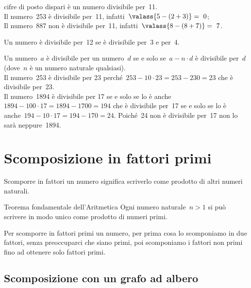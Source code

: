 \begin{description} [noitemsep]
cifre di posto dispari è un numero divisibile per~11.\\
Il numero~253 è divisibile per~11, infatti~\(\valass{5-(2+3)} =~0\);\\
Il numero~887 non è divisibile per~11, infatti~\(\valass{8-(8+7)}=~7\).
\item[\textbf{12}:~] Un numero è divisibile per~12 se è 
divisibile 
per~3 e per~4.
\item[\textbf{un numero qualunque}:~] Un numero~\(a\) è divisibile 
per un numero~\(d\) se e solo se~\(a - n \cdot d\) è divisibile per~\(d\) 
(dove~\(n\) è un numero naturale qualsiasi).\\
Il numero~253 è divisibile per 23 
perché~\(253 - 10 \cdot 23 = 253 - 230 = 23\) che è divisibile per~23.\\
Il numero~1894 è divisibile per 17 se e solo se lo è 
anche~\(1894 - 100 \cdot 17 = 1894 - 1700 = 194\) 
che è divisibile per~17 se e solo se lo è
anche~\(194 - 10 \cdot 17 = 194 - 170 = 24\). 
Poiché~24 non è divisibile per~17 non lo sarà neppure~1894.
\end{description}



\section{Scomposizione in fattori primi}
\label{sec:nat_scomposizione}

Scomporre in fattori un numero significa scriverlo come prodotto di altri 
numeri naturali. 


\begin{teorema}{Teorema fondamentale dell'Aritmetica}{}
Ogni numero naturale~\(n>1\) si può scrivere in modo unico come prodotto di 
numeri primi.
\end{teorema}

Per scomporre in fattori primi un numero, per prima cosa lo scomponiamo in 
due fattori, senza preoccuparci che siano primi, poi scomponiamo i fattori
non primi fino ad ottenere solo fattori primi.

\subsection{Scomposizione con un grafo ad albero}


